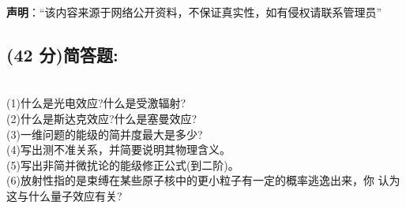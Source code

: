 
\textbf{声明}：“该内容来源于网络公开资料，不保证真实性，如有侵权请联系管理员”

\subsection{(42 分)简答题:}\\
(1)什么是光电效应?什么是受激辐射?\\
(2)什么是斯达克效应?什么是塞曼效应?\\
(3)一维问题的能级的简并度最大是多少?\\
(4)写出测不准关系，并简要说明其物理含义。\\
(5)写出非简并微扰论的能级修正公式(到二阶)。\\
(6)放射性指的是束缚在某些原子核中的更小粒子有一定的概率逃逸出来，你
认为这与什么量子效应有关?\\
